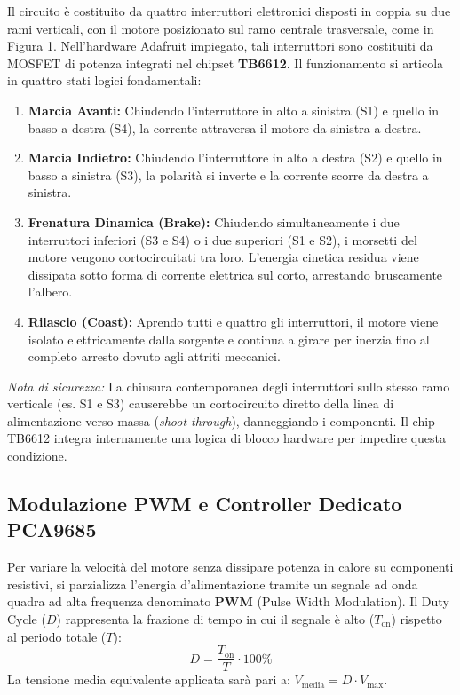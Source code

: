 \documentclass{article}
\begin{document}
\noindent Il circuito è costituito da quattro interruttori elettronici disposti in coppia su due rami verticali, con il motore posizionato sul ramo centrale trasversale, come in Figura 1. Nell'hardware Adafruit impiegato, tali interruttori sono costituiti da MOSFET di potenza integrati nel chipset \textbf{TB6612}. Il funzionamento si articola in quattro stati logici fondamentali:
\begin{enumerate}
\item \textbf{Marcia Avanti:} Chiudendo l'interruttore in alto a sinistra (S1) e quello in basso a destra (S4), la corrente attraversa il motore da sinistra a destra.
\item \textbf{Marcia Indietro:} Chiudendo l'interruttore in alto a destra (S2) e quello in basso a sinistra (S3), la polarità si inverte e la corrente scorre da destra a sinistra.
\item \textbf{Frenatura Dinamica (Brake):} Chiudendo simultaneamente i due interruttori inferiori (S3 e S4) o i due superiori (S1 e S2), i morsetti del motore vengono cortocircuitati tra loro. L'energia cinetica residua viene dissipata sotto forma di corrente elettrica sul corto, arrestando bruscamente l'albero.
\item \textbf{Rilascio (Coast):} Aprendo tutti e quattro gli interruttori, il motore viene isolato elettricamente dalla sorgente e continua a girare per inerzia fino al completo arresto dovuto agli attriti meccanici.
\end{enumerate}
\textit{Nota di sicurezza:} La chiusura contemporanea degli interruttori sullo stesso ramo verticale (es. S1 e S3) causerebbe un cortocircuito diretto della linea di alimentazione verso massa (\textit{shoot-through}), danneggiando i componenti. Il chip TB6612 integra internamente una logica di blocco hardware per impedire questa condizione.

\subsection{Modulazione PWM e Controller Dedicato PCA9685}
Per variare la velocità del motore senza dissipare potenza in calore su componenti resistivi, si parzializza l'energia d'alimentazione tramite un segnale ad onda quadra ad alta frequenza denominato \textbf{PWM} (Pulse Width Modulation). Il Duty Cycle ($D$) rappresenta la frazione di tempo in cui il segnale è alto ($T_{\text{on}}$) rispetto al periodo totale ($T$):
$$D = \frac{T_{\text{on}}}{T} \cdot 100\%$$
La tensione media equivalente applicata sarà pari a: $V_{\text{media}} = D \cdot V_{\text{max}}$.
\end{document}
